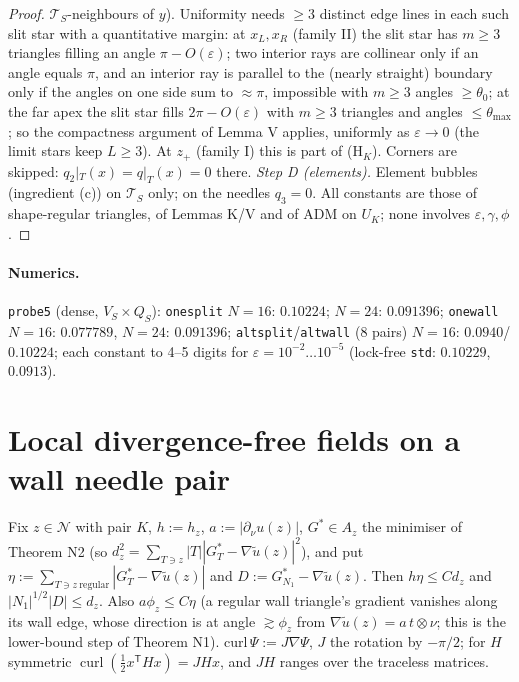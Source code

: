 \documentclass[11pt]{article}
\theoremstyle{remark}
\newcommand{\dn}{\partial_\nu}
\newcommand{\Nset}{\mathcal N}
\newcommand{\curl}{\operatorname{curl}}
\begin{document}
\begin{proof}
$\mathcal T_S$-neighbours of $y$). Uniformity needs $\ge3$ distinct edge lines in each such slit star with a quantitative margin: at $x_L,x_R$ (family II)
the slit star has $m\ge3$ triangles filling an angle $\pi-O(\varepsilon)$; two interior rays are collinear only if an angle equals $\pi$, and an interior
ray is parallel to the (nearly straight) boundary only if the angles on one side sum to $\approx\pi$, impossible with $m\ge3$ angles $\ge\theta_0$;
at the far apex the slit star fills $2\pi-O(\varepsilon)$ with $m\ge3$ triangles and angles $\le\theta_{\max}$; so the compactness argument of Lemma V
applies, uniformly as $\varepsilon\to0$ (the limit stars keep $L\ge3$). At $z_+$ (family I) this is part of (H$_K$).
Corners are skipped: $q_2|_T(x)=q|_T(x)=0$ there.
\emph{Step D (elements).} Element bubbles (ingredient (c)) on $\mathcal T_S$ only; on the needles $q_3=0$.
All constants are those of shape-regular triangles, of Lemmas K/V and of ADM on $U_K$; none involves $\varepsilon,\gamma,\phi$.
\end{proof}
\paragraph{Numerics.} \texttt{probe5} (dense, $V_S\times Q_S$): \texttt{onesplit} $N=16$: $0.10224$; $N=24$: $0.091396$; \texttt{onewall} $N=16$: $0.077789$,
$N=24$: $0.091396$; \texttt{altsplit}/\texttt{altwall} ($8$ pairs) $N=16$: $0.0940$/$0.10224$; each constant to 4--5 digits for
$\varepsilon=10^{-2}\dots10^{-5}$ (lock-free \texttt{std}: $0.10229$, $0.0913$).

\section{Local divergence-free fields on a wall needle pair}\label{sec:A}
Fix $z\in\Nset$ with pair $K$, $h:=h_z$, $a:=|\dn u(z)|$, $G^*\in A_z$ the minimiser of Theorem N2 (so $d_z^2=\sum_{T\ni z}|T||G^*_T-\nabla\tilde u(z)|^2$),
and put $\eta:=\sum_{T\ni z\ \mathrm{regular}}|G^*_T-\nabla\tilde u(z)|$ and $D:=G^*_{N_1}-\nabla\tilde u(z)$. Then $h\eta\le Cd_z$ and
$|N_1|^{1/2}|D|\le d_z$. Also $a\phi_z\le C\eta$ (a regular wall triangle's gradient vanishes along its wall edge, whose direction is at angle $\gtrsim\phi_z$
from $\nabla\tilde u(z)=a\,t\otimes\nu$; this is the lower-bound step of Theorem N1). $\mathrm{curl}\,\Psi:=J\nabla\Psi$, $J$ the rotation by $-\pi/2$;
for $H$ symmetric $\curl(\frac12x^{\mathsf T}Hx)=JHx$, and $JH$ ranges over the traceless matrices.
\end{document}

